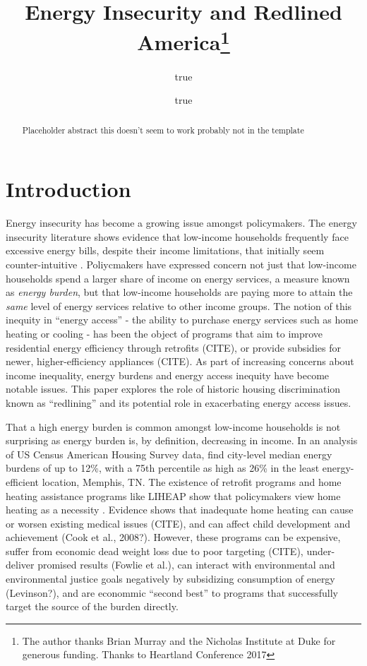 \documentclass[
]{article}
\title{Energy Insecurity and Redlined America\thanks{The author thanks Brian Murray and the Nicholas Institute at Duke for generous funding. Thanks to Heartland Conference 2017}}
\author{true \and true}
\date{}
\begin{document}
\maketitle
\begin{abstract}
Placeholder abstract this doesn't seem to work probably not in the template
\end{abstract}

\hypertarget{introduction}{%
\section{Introduction}\label{introduction}}

Energy insecurity has become a growing issue amongst policymakers. The energy insecurity literature shows evidence that low-income households frequently face
excessive energy bills, despite their income limitations, that initially seem counter-intuitive
\citep{Drehobl2016, Hernandez2013, Hernandez2010}. Poliycmakers have expressed concern not just that low-income
households spend a larger share of income on energy services, a measure known as \emph{energy burden}, but that low-income households are
paying more to attain the \emph{same} level of energy services relative to other income groups. The notion
of this inequity in ``energy access'' - the ability to purchase energy services such as home heating or cooling - has
been the object of programs that aim to improve residential energy efficiency through retrofits (CITE),
or provide subsidies for newer, higher-efficiency appliances (CITE). As part of increasing concerns
about income inequality, energy burdens and energy access inequity have become notable issues. This paper
explores the role of historic housing discrimination known as ``redlining'' and its potential role
in exacerbating energy access issues.

That a high energy burden is common amongst low-income households is not surprising as energy burden is,
by definition, decreasing in income. In an analysis of US Census American Housing Survey data, \citet{Drehobl2016} find city-level median energy burdens
of up to 12\%, with a 75th percentile as high as 26\% in the least energy-efficient location, Memphis, TN.
The existence of retrofit programs and home heating assistance programs like LIHEAP show that policymakers view home heating as a necessity \citep{Stein2018b}. Evidence
shows that inadequate home heating can cause or worsen existing medical issues (CITE), and
can affect child development and achievement (Cook et al., 2008?). However, these programs can be
expensive, suffer from economic dead weight loss due to poor targeting (CITE), under-deliver
promised results (Fowlie et al.), can interact with environmental and environmental justice goals negatively by subsidizing consumption
of energy (Levinson?), and are econommic ``second best'' to programs that successfully target the
source of the burden directly.
\end{document}
